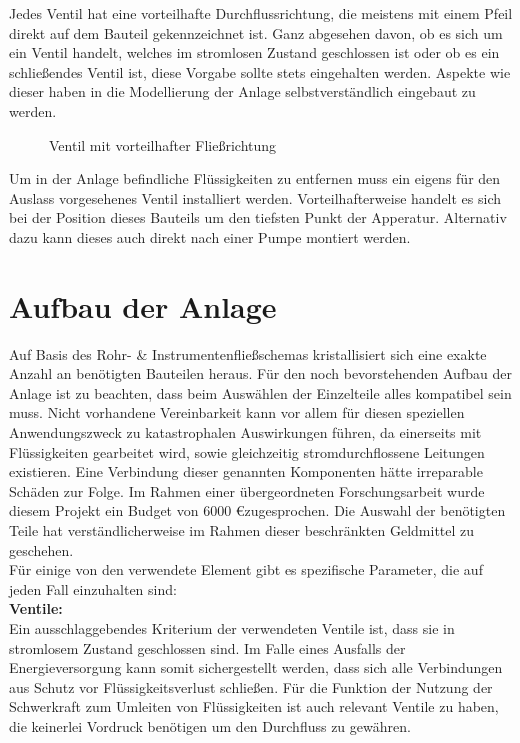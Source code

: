 Jedes Ventil hat eine vorteilhafte Durchflussrichtung, die meistens mit einem Pfeil direkt auf dem Bauteil gekennzeichnet ist. Ganz abgesehen davon, ob es sich um ein Ventil handelt, welches im stromlosen Zustand geschlossen ist oder ob es ein schließendes Ventil ist, diese Vorgabe sollte stets eingehalten werden. Aspekte wie dieser haben in die Modellierung der Anlage selbstverständlich eingebaut zu werden.\\


\begin{figure}[h!]
  \centering
  \caption{Ventil mit vorteilhafter Fließrichtung}
\end{figure}

Um in der Anlage befindliche Flüssigkeiten zu entfernen muss ein eigens für den Auslass vorgesehenes Ventil installiert werden. Vorteilhafterweise handelt es sich bei der Position dieses Bauteils um den tiefsten Punkt der Apperatur. Alternativ dazu kann dieses auch direkt nach einer Pumpe montiert werden.

\section{Aufbau der Anlage}
Auf Basis des Rohr- \& Instrumentenfließschemas kristallisiert sich eine exakte Anzahl an benötigten Bauteilen heraus. Für den noch bevorstehenden Aufbau der Anlage ist zu beachten, dass beim Auswählen der Einzelteile alles kompatibel sein muss. Nicht vorhandene Vereinbarkeit kann vor allem für diesen speziellen Anwendungszweck zu katastrophalen Auswirkungen führen, da einerseits mit Flüssigkeiten gearbeitet wird, sowie gleichzeitig stromdurchflossene Leitungen existieren. Eine Verbindung dieser genannten Komponenten hätte irreparable Schäden zur Folge. Im Rahmen einer übergeordneten Forschungsarbeit wurde diesem Projekt ein Budget von 6000  \euro \space zugesprochen. Die Auswahl der benötigten Teile hat verständlicherweise im Rahmen dieser beschränkten Geldmittel zu geschehen.\\
	
	Für einige von den verwendete Element gibt es spezifische Parameter, die auf jeden Fall einzuhalten sind:\\
	
	\textbf{Ventile:}\\
	Ein ausschlaggebendes Kriterium der verwendeten Ventile ist, dass sie in stromlosem Zustand geschlossen sind. Im Falle eines Ausfalls der Energieversorgung kann somit sichergestellt werden, dass sich alle Verbindungen aus Schutz vor Flüssigkeitsverlust schließen. Für die Funktion der Nutzung der Schwerkraft zum Umleiten von Flüssigkeiten ist auch relevant Ventile zu haben, die keinerlei Vordruck benötigen um den Durchfluss zu gewähren.\\

